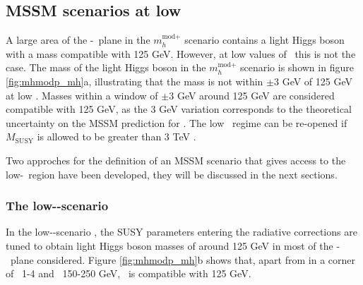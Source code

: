 \subsection{MSSM scenarios at low \tanb}
\label{sec:mssm_theory_lowtb}
A large area of the \mA-\tanb~plane in the $m_{h}^{\text{mod+}}$ 
scenario contains a light Higgs boson with a mass compatible with
125 GeV. However, at low values of \tanb~this is not the case.
The mass of the light Higgs
boson in the $m_{h}^{\text{mod}+}$ scenario is shown in 
figure \ref{fig:mhmodp_mh}a, illustrating that the mass 
is not within $\pm 3$ GeV of 125 GeV at low \tanb. Masses within
a window of $\pm3$ GeV around 125 GeV are considered compatible with 125
GeV, as the 3 GeV variation corresponds to the theoretical uncertainty on the 
\ac{MSSM} prediction for \mh.
The low \tanb~regime can be re-opened
if $M_{\text{SUSY}}$ is allowed to be greater than 3 TeV \cite{MSSM-reopen}. 
%


Two approches for the definition of an MSSM scenario that gives
access to the low-\tanb~region have been developed, they will be
discussed in the next sections.

\subsubsection{The low-\tanb-scenario}
\label{sec:theory_BSM_model_lowtb}
In the low-\tanb-scenario \cite{Hein-low-tb-high,MSSM-lowtanb}, the SUSY parameters entering
the radiative corrections are tuned to obtain light 
Higgs boson masses of around 125 GeV in most of the \mA-\tanb~plane considered.
Figure \ref{fig:mhmodp_mh}b shows that, apart from in a corner of \tanb~1-4 and 
\mA~150-250 GeV, \mh~is compatible with 125 GeV.

